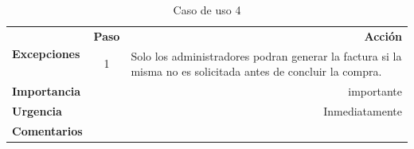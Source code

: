 \documentclass[conference]{IEEEtran}
\begin{document}
\begin{table}[H]
\begin{adjustbox}{width=0.44\textwidth}
\begin{tabular}{|p{11.215em}|r|r|}
    \midrule
    \multirow{3}[4]{*}{\textbf{Excepciones}} & \multicolumn{1}{p{5.355em}|}{\textbf{Paso}} & \multicolumn{1}{p{32em}|}{\textbf{Acción}} \\
\cmidrule{2-3}    \multicolumn{1}{|c|}{} & \multicolumn{1}{c|}{\multirow{2}[2]{*}{1}} & \multicolumn{1}{l|}{\multirow{2}[2]{*}{Solo los administradores podran generar la factura si la misma no es solicitada antes de concluir la compra.}} \\
    \multicolumn{1}{|c|}{} & \multicolumn{1}{c|}{} &  \\
    \midrule
    \textbf{Importancia} & \multicolumn{2}{p{37.355em}|}{importante } \\
    \midrule
    \textbf{Urgencia} & \multicolumn{2}{p{37.355em}|}{Inmediatamente} \\
    \midrule
    \textbf{Comentarios} & \multicolumn{2}{r|}{} \\
    \bottomrule
    \end{tabular}%
    \end{adjustbox}
    \vspace{0.2cm}
    \caption{Caso de uso 4}
  \label{tab:addlabel}%
\end{table}%
\end{document}
